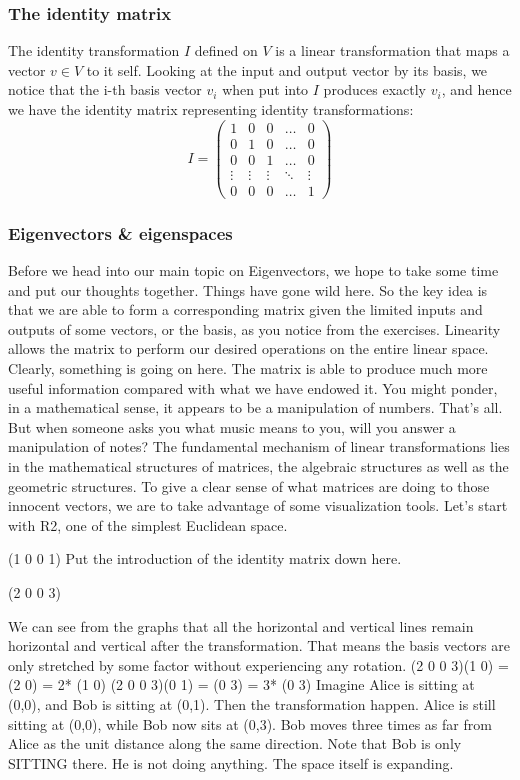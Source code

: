 \documentclass[12pt]{article}
\begin{document}
\subsubsection{The identity matrix}
The identity transformation $I$ defined on $V$ is a linear transformation that maps a vector $v\in V$ to it self. Looking at the input and output vector by its basis, we notice that the i-th basis vector $v_i$ when put into $I$ produces exactly $v_i$, and hence we have the identity matrix representing identity transformations:
$$I=\begin{pmatrix}
1 &0 &0 &\dots &0\\
0 &1 &0 &\dots &0\\
0 &0 &1 &\dots &0\\
\vdots &\vdots &\vdots &\ddots &\vdots\\
0 &0 &0 &\dots &1
\end{pmatrix}$$
\subsubsection{Eigenvectors \& eigenspaces}

Before we head into our main topic on Eigenvectors, we hope to take some time and put our thoughts together. Things have gone wild here. So the key idea is that we are able to form a corresponding matrix given the limited inputs and outputs of some vectors, or the basis, as you notice from the exercises. Linearity allows the matrix to perform our desired operations on the entire linear space. Clearly, something is going on here. The matrix is able to produce much more useful information compared with what we have endowed it. You might ponder, in a mathematical sense, it appears to be a manipulation of numbers. That’s all. But when someone asks you what music means to you, will you answer a manipulation of notes? The fundamental mechanism of linear transformations lies in the mathematical structures of matrices, the algebraic structures as well as the geometric structures. To give a clear sense of what matrices are doing to those innocent vectors, we are to take advantage of some visualization tools. Let’s start with R2, one of the simplest Euclidean space.

(1 0 0 1)
Put the introduction of the identity matrix down here.

(2 0 0 3) 

We can see from the graphs that all the horizontal and vertical lines remain horizontal and vertical after the transformation. That means the basis vectors are only stretched by some factor without experiencing any rotation.
(2 0 0 3)(1 0) = (2 0) = 2* (1 0)
(2 0 0 3)(0 1) = (0 3) = 3* (0 3)
Imagine Alice is sitting at (0,0), and Bob is sitting at (0,1). Then the transformation happen. Alice is still sitting at (0,0), while Bob now sits at (0,3). Bob moves three times as far from Alice as the unit distance along the same direction. Note that Bob is only SITTING there. He is not doing anything. The space itself is expanding.
\end{document}
